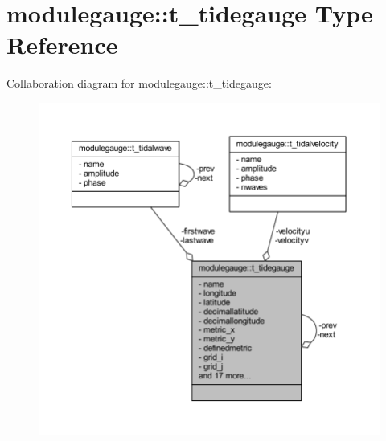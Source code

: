 \hypertarget{structmodulegauge_1_1t__tidegauge}{}\section{modulegauge\+:\+:t\+\_\+tidegauge Type Reference}
\label{structmodulegauge_1_1t__tidegauge}


Collaboration diagram for modulegauge\+:\+:t\+\_\+tidegauge\+:\nopagebreak
\begin{figure}[H]
\begin{center}
\leavevmode
\includegraphics[width=350pt]{structmodulegauge_1_1t__tidegauge__coll__graph}
\end{center}
\end{figure}
